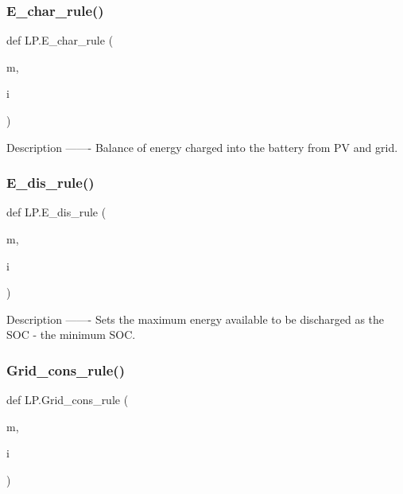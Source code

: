 \subsubsection{\texorpdfstring{E\+\_\+char\+\_\+rule()}{E\_char\_rule()}}
{\footnotesize\ttfamily def L\+P.\+E\+\_\+char\+\_\+rule (\begin{DoxyParamCaption}\item[{}]{m,  }\item[{}]{i }\end{DoxyParamCaption})}

\begin{DoxyVerb}Description
-------
Balance of energy charged into the battery from PV and grid.
\end{DoxyVerb}
 \mbox{\label{namespace_l_p_ab78ac81e78bfa9c6a030d20f4422d4ab}} 
\subsubsection{\texorpdfstring{E\+\_\+dis\+\_\+rule()}{E\_dis\_rule()}}
{\footnotesize\ttfamily def L\+P.\+E\+\_\+dis\+\_\+rule (\begin{DoxyParamCaption}\item[{}]{m,  }\item[{}]{i }\end{DoxyParamCaption})}

\begin{DoxyVerb}Description
-------
Sets the maximum energy available to be discharged as the SOC - the minimum SOC.
\end{DoxyVerb}
 \mbox{\label{namespace_l_p_a0aaf8565592895b8afeffcd33c6452c7}} 
\subsubsection{\texorpdfstring{Grid\+\_\+cons\+\_\+rule()}{Grid\_cons\_rule()}}
{\footnotesize\ttfamily def L\+P.\+Grid\+\_\+cons\+\_\+rule (\begin{DoxyParamCaption}\item[{}]{m,  }\item[{}]{i }\end{DoxyParamCaption})}

